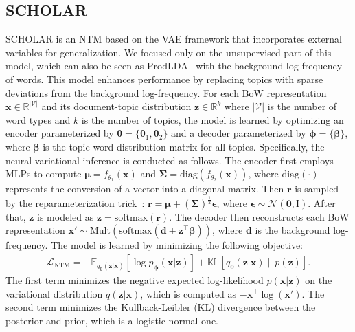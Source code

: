 \documentclass{article}
\begin{document}
\subsection{SCHOLAR}\label{scholar}
SCHOLAR is an NTM based on the VAE framework that incorporates external variables for generalization.
We focused only on the unsupervised part of this model, which can also be seen as ProdLDA~\cite{srivastava2017autoencoding} with the background log-frequency of words.
This model enhances performance by replacing topics with sparse deviations from the background log-frequency.
For each BoW representation $\mathbf{x} \in \mathbb{R}^{\mathcal{|V|}}$ and its document-topic distribution $\mathbf{z} \in \mathbb{R}^k$ where $|\mathcal{V}|$ is the number of word types and $k$ is the number of topics, the model is learned by optimizing an encoder parameterized by 
$\boldsymbol{\theta} = \{\boldsymbol{\theta}_1, \boldsymbol{\theta}_2\}$ and a decoder parameterized by $\boldsymbol{\phi}=\{\boldsymbol{\beta}\}$, where $\boldsymbol{\beta}$ is the topic-word distribution matrix for all topics.
Specifically, the neural variational inference is conducted as follows. The encoder first employs MLPs to compute $\boldsymbol{\mu}=f_{\theta_1}(\mathbf{x})$ and $\boldsymbol{\Sigma}=\text{diag}(f_{\theta_2}(\mathbf{x}))$, where $\text{diag}(\cdot)$ represents the conversion of a vector into a diagonal matrix. 
Then $\boldsymbol{r}$ is sampled by the reparameterization trick~\cite{welling2014auto}: $\boldsymbol{r}=\boldsymbol{\mu}+(\boldsymbol{\Sigma})^{\frac{1}{2}}\boldsymbol{\epsilon}$, where $\boldsymbol{\epsilon}\sim \mathcal{N}(\boldsymbol{0}, \boldsymbol{\mathrm{I}})$.
After that, $\mathbf{z}$ is modeled as $\mathbf{z}=\text{softmax}(\boldsymbol{r})$.
The decoder then reconstructs each BoW representation $\mathbf{x'}\sim \text{Mult}(\text{softmax}(\boldsymbol{d}+\mathbf{z}^{\top}\boldsymbol{\beta}))$, where $\boldsymbol{d}$ is the background log-frequency.
The model is learned by minimizing the following objective:
\begin{eqnarray} \label{eq:ntm}
    \mathcal{L}_\text{NTM} = -\mathbb{E}_{q_{\boldsymbol{\theta}}(\mathbf{z}|\mathbf{x})}[\log p_{\boldsymbol{\phi}}(\mathbf{x}|\mathbf{z})]+\mathbb{KL}[q_{\boldsymbol{\theta}}(\mathbf{z}|\mathbf{x})\|p(\mathbf{z})].
\end{eqnarray}
The first term minimizes the negative expected log-likelihood $p(\mathbf{x}|\mathbf{z})$ on the variational distribution $q(\mathbf{z}|\mathbf{x})$, which is computed as $-\mathbf{x}^{\top}\log (\mathbf{x'})$.
The second term minimizes the Kullback-Leibler (KL) divergence between the posterior and prior, which is a logistic normal one.
\end{document}
